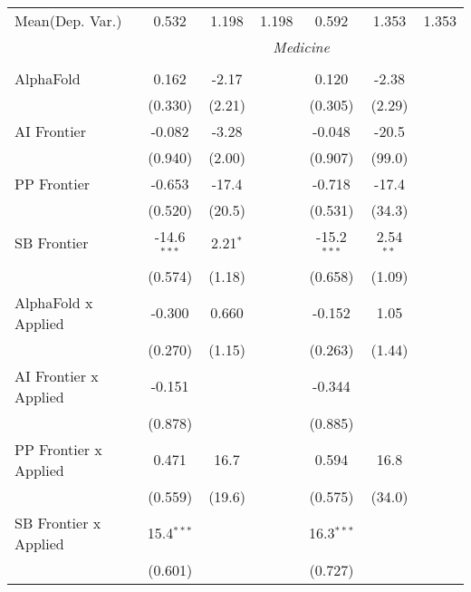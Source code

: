 \begin{tabular}{lcccccc}
Mean(Dep. Var.) & 0.532 & 1.198 & 1.198 & 0.592 & 1.353 & 1.353 \\
 & \multicolumn{6}{c}{\textit{Medicine}} \\ \\
   AlphaFold                    & 0.162         & -2.17      &             & 0.120         & -2.38       &   \\   
                                & (0.330)       & (2.21)     &             & (0.305)       & (2.29)      &   \\   
   AI Frontier                  & -0.082        & -3.28      &             & -0.048        & -20.5       &   \\   
                                & (0.940)       & (2.00)     &             & (0.907)       & (99.0)      &   \\   
   PP Frontier                  & -0.653        & -17.4      &             & -0.718        & -17.4       &   \\   
                                & (0.520)       & (20.5)     &             & (0.531)       & (34.3)      &   \\   
   SB Frontier                  & -14.6$^{***}$ & 2.21$^{*}$ &             & -15.2$^{***}$ & 2.54$^{**}$ &   \\   
                                & (0.574)       & (1.18)     &             & (0.658)       & (1.09)      &   \\   
   AlphaFold x Applied          & -0.300        & 0.660      &             & -0.152        & 1.05        &   \\   
                                & (0.270)       & (1.15)     &             & (0.263)       & (1.44)      &   \\   
   AI Frontier x Applied        & -0.151        &            &             & -0.344        &             &   \\   
                                & (0.878)       &            &             & (0.885)       &             &   \\   
   PP Frontier x Applied        & 0.471         & 16.7       &             & 0.594         & 16.8        &   \\   
                                & (0.559)       & (19.6)     &             & (0.575)       & (34.0)      &   \\   
   SB Frontier x Applied        & 15.4$^{***}$  &            &             & 16.3$^{***}$  &             &   \\   
                                & (0.601)       &            &             & (0.727)       &             &   \\   

\end{tabular}
